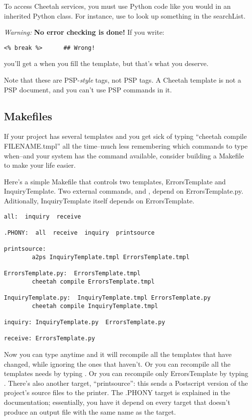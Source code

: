 To access Cheetah services, you must use Python code like you would in an
inherited Python class.  For instance, use  to look up
something in the searchList.

{\em Warning:} {\bf No error checking is done!}  If you write:
\begin{verbatim}
<% break %>      ## Wrong!
\end{verbatim}
you'll get a  when you fill the template, but that's what you
deserve.

Note that these are PSP-{\em style} tags, not PSP tags.  A Cheetah template
is not a PSP document, and you can't use PSP commands in it.



\subsection{Makefiles}
\label{tips.Makefile}

If your project has several templates and you get sick of typing
``cheetah compile FILENAME.tmpl'' all the time--much less remembering which
commands to type when--and your system has the 
command available, consider building a Makefile to make your life easier.

Here's a simple Makefile that controls two templates, ErrorsTemplate and
InquiryTemplate.  Two external commands,  and ,
depend on ErrorsTemplate.py.  Aditionally, InquiryTemplate
itself depends on ErrorsTemplate.

\begin{verbatim}
all:  inquiry  receive

.PHONY:  all  receive  inquiry  printsource

printsource:
        a2ps InquiryTemplate.tmpl ErrorsTemplate.tmpl

ErrorsTemplate.py:  ErrorsTemplate.tmpl
        cheetah compile ErrorsTemplate.tmpl

InquiryTemplate.py:  InquiryTemplate.tmpl ErrorsTemplate.py
        cheetah compile InquiryTemplate.tmpl

inquiry: InquiryTemplate.py  ErrorsTemplate.py

receive: ErrorsTemplate.py
\end{verbatim}

Now you can type  anytime and it will recompile all the templates
that have changed, while ignoring the ones that haven't.  Or you can
recompile all the templates  needs by typing .
Or you can recompile only ErrorsTemplate by typing
.  There's also another target, ``printsource'':
this sends a Postscript version of the project's source files to the printer.
The .PHONY target is explained in the  documentation; essentially,
you have it depend on every target that doesn't produce an output file with
the same name as the target.


